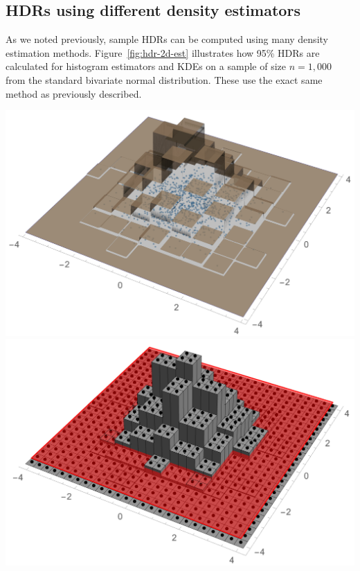 \newpage

\subsection{HDRs using different density estimators}\label{sec:hdr-methods}

As we noted previously, sample HDRs can be computed using many density estimation methods.
Figure~\ref{fig:hdr-2d-est} illustrates how 95\% HDRs are calculated for histogram estimators and KDEs on a sample of size $n=1,000$ from the standard bivariate normal distribution.
These use the exact same method as previously described.




\begin{widefigure}[h!]%
  \centering
  \includegraphics[scale=.225]{figures/fhat-hist-1.pdf}
  \includegraphics[scale=.225]{figures/fhat-hist-3.pdf}

\end{widefigure}
